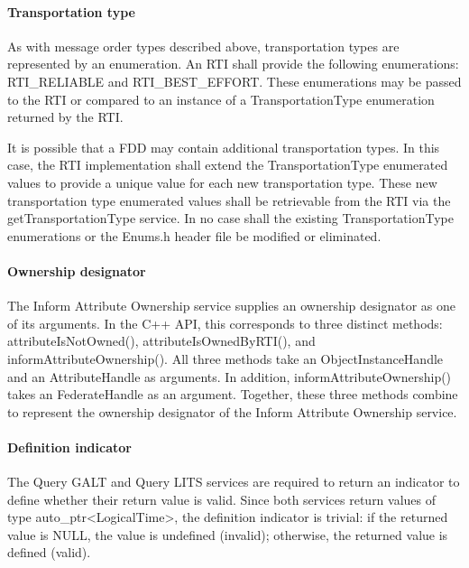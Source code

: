 \begin{compactstdpage}
    \paragraph{Transportation type}

    As with message order types described above, transportation types are represented by an enumeration. An RTI shall provide the following enumerations: RTI\_RELIABLE and RTI\_BEST\_EFFORT. These enumerations may be passed to the RTI or compared to an instance of a TransportationType enumeration returned by the RTI.

    It is possible that a FDD may contain additional transportation types. In this case, the RTI implementation shall extend the TransportationType enumerated values to provide a unique value for each new transportation type. These new transportation type enumerated values shall be retrievable from the RTI via the getTransportationType service. In no case shall the existing TransportationType enumerations or the Enums.h header file be modified or eliminated.

    \paragraph{Ownership designator}

    The Inform Attribute Ownership \rtiinitiated{} service supplies an ownership designator as one of its arguments. In the C++ API, this corresponds to three distinct methods: attributeIsNotOwned(), attributeIsOwnedByRTI(), and informAttributeOwnership(). All three methods take an ObjectInstanceHandle and an AttributeHandle as arguments. In addition, informAttributeOwnership() takes an FederateHandle as an argument. Together, these three methods combine to represent the ownership designator of the Inform Attribute Ownership \rtiinitiated{} service.

    \paragraph{Definition indicator}

    The Query GALT and Query LITS services are required to return an indicator to define whether their return value is valid. Since both services return values of type auto\_ptr\textless{}LogicalTime\textgreater{}, the definition indicator is trivial: if the returned value is NULL, the value is undefined (invalid); otherwise, the returned value is defined (valid).


\end{compactstdpage}
